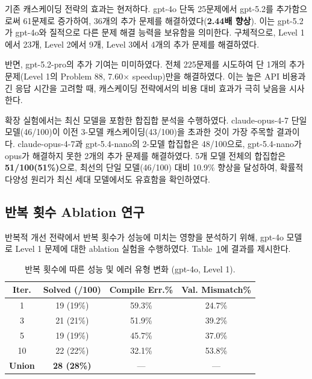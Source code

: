 \documentclass[sigplan,screen,review,anonymous]{acmart}
\begin{document}
기존 캐스케이딩 전략의 효과는 현저하다. gpt-4o 단독 25문제에서 gpt-5.2를 추가함으로써 61문제로 증가하여, 36개의 추가 문제를 해결하였다(\textbf{2.44배 향상}). 이는 gpt-5.2가 gpt-4o와 질적으로 다른 문제 해결 능력을 보유함을 의미한다. 구체적으로, Level 1에서 23개, Level 2에서 9개, Level 3에서 4개의 추가 문제를 해결하였다.

반면, gpt-5.2-pro의 추가 기여는 미미하였다. 전체 225문제를 시도하여 단 1개의 추가 문제(Level 1의 Problem 88, 7.60$\times$ speedup)만을 해결하였다. 이는 높은 API 비용과 긴 응답 시간을 고려할 때, 캐스케이딩 전략에서의 비용 대비 효과가 극히 낮음을 시사한다.

확장 실험에서는 최신 모델을 포함한 합집합 분석을 수행하였다. claude-opus-4-7 단일 모델(46/100)이 이전 3-모델 캐스케이딩(43/100)을 초과한 것이 가장 주목할 결과이다. claude-opus-4-7과 gpt-5.4-nano의 2-모델 합집합은 48/100으로, gpt-5.4-nano가 opus가 해결하지 못한 2개의 추가 문제를 해결하였다. 5개 모델 전체의 합집합은 \textbf{51/100(51\%)}으로, 최선의 단일 모델(46/100) 대비 10.9\% 향상을 달성하여, 확률적 다양성 원리가 최신 세대 모델에서도 유효함을 확인하였다.

\subsection{반복 횟수 Ablation 연구}

반복적 개선 전략에서 반복 횟수가 성능에 미치는 영향을 분석하기 위해, gpt-4o 모델로 Level 1 문제에 대한 ablation 실험을 수행하였다. Table~\ref{tab:ablation}에 결과를 제시한다.

\begin{table}[t]
\centering
\caption{반복 횟수에 따른 성능 및 에러 유형 변화 (gpt-4o, Level 1).}
\label{tab:ablation}
\begin{tabular}{cccc}
\toprule
\textbf{Iter.} & \textbf{Solved (/100)} & \textbf{Compile Err.\%} & \textbf{Val. Mismatch\%} \\
\midrule
1 & 19 (19\%) & 59.3\% & 24.7\% \\
3 & 21 (21\%) & 51.9\% & 39.2\% \\
5 & 19 (19\%) & 45.7\% & 37.0\% \\
10 & 22 (22\%) & 32.1\% & 53.8\% \\
\midrule
\textbf{Union} & \textbf{28 (28\%)} & --- & --- \\
\bottomrule
\end{tabular}
\end{table}


\end{document}

